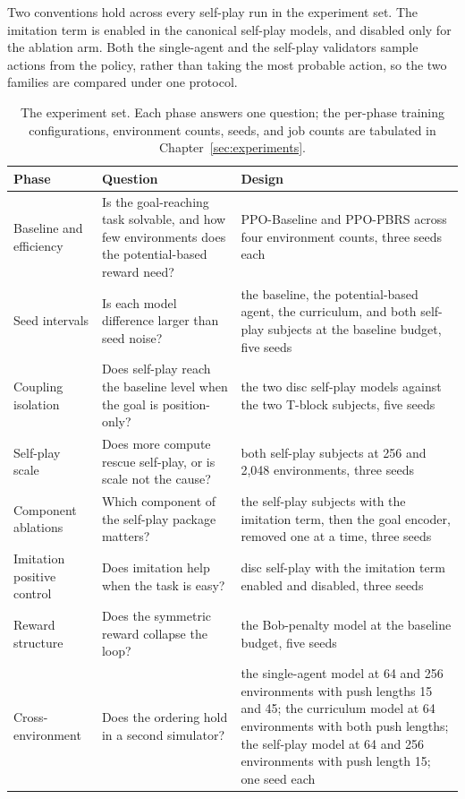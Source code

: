 Two conventions hold across every self-play run in the experiment set. The
imitation term is enabled in the canonical self-play models, and disabled only for
the ablation arm. Both the single-agent and the self-play validators sample
actions from the policy, rather than taking the most probable action, so the two
families are compared under one protocol.

\begin{table}[H]
    \centering
    \small
    \begin{tabularx}{\textwidth}{l X X}
        \hline
        \textbf{Phase} & \textbf{Question} & \textbf{Design} \\
        \hline
        Baseline and efficiency & Is the goal-reaching task solvable, and how few
        environments does the potential-based reward need? &
        PPO-Baseline and PPO-PBRS across four environment counts, three seeds each \\
        Seed intervals & Is each model difference larger than seed noise? &
        the baseline, the potential-based agent, the curriculum, and both
        self-play subjects at the baseline budget, five seeds \\
        Coupling isolation & Does self-play reach the baseline level when the goal is
        position-only? &
        the two disc self-play models against the two T-block subjects, five seeds \\
        Self-play scale & Does more compute rescue self-play, or is scale not the
        cause? &
        both self-play subjects at 256 and 2{,}048 environments, three seeds \\
        Component ablations & Which component of the self-play package matters? &
        the self-play subjects with the imitation term, then the goal encoder,
        removed one at a time, three seeds \\
        Imitation positive control & Does imitation help when the task is easy? &
        disc self-play with the imitation term enabled and disabled, three seeds \\
        Reward structure & Does the symmetric reward collapse the loop? &
        the Bob-penalty model at the baseline budget, five seeds \\
        Cross-environment & Does the ordering hold in a second simulator? &
        the single-agent model at 64 and 256 environments with push lengths 15
        and 45; the curriculum model at 64 environments with both push lengths;
        the self-play model at 64 and 256 environments with push length 15;
        one seed each \\
        \hline
    \end{tabularx}
    \caption{The experiment set. Each phase answers one question; the per-phase
    training configurations, environment counts, seeds, and job counts are
    tabulated in Chapter~\ref{sec:experiments}.}
    \label{tab:experiment-set}
\end{table}

